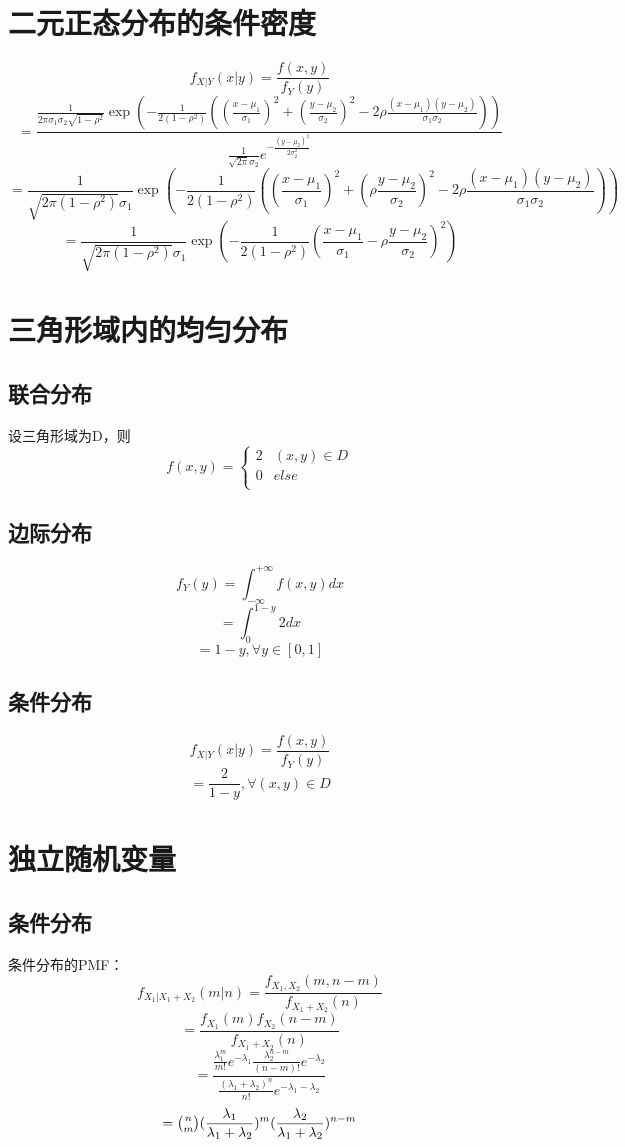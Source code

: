\documentclass{article}
\begin{document}
\begin{CJK}{UTF8}{gbsn}
\section{二元正态分布的条件密度}
$$ f_{X|Y}(x|y)=\frac{f(x,y)}{f_{Y}(y)}$$
$$ =\frac{\frac{1}{2\pi\sigma_{1}\sigma_{2}\sqrt{1-\rho^{2}}}\exp{(-\frac{1}{2(1-\rho^{2})}((\frac{x-\mu_{1}}{\sigma_{1}})^{2}+(\frac{y-\mu_{2}}{\sigma_{2}})^{2}-2\rho\frac{(x-\mu_{1})(y-\mu_{2})}{\sigma_{1}\sigma_{2}}))}}{\frac{1}{\sqrt{2\pi}\sigma_{2}}e^{-\frac{(y-\mu_{2})^{2}}{2\sigma_{2}^{2}}}}$$
$$ =\frac{1}{\sqrt{2\pi(1-\rho^{2})}\sigma_{1}}\exp{(-\frac{1}{2(1-\rho^{2})}((\frac{x-\mu_{1}}{\sigma_{1}})^{2}+(\rho\frac{y-\mu_{2}}{\sigma_{2}})^{2}-2\rho\frac{(x-\mu_{1})(y-\mu_{2})}{\sigma_{1}\sigma_{2}}))}$$
$$ =\frac{1}{\sqrt{2\pi(1-\rho^{2})}\sigma_{1}}\exp{(-\frac{1}{2(1-\rho^{2})}(\frac{x-\mu_{1}}{\sigma_{1}}-\rho\frac{y-\mu_{2}}{\sigma_{2}})^{2})}$$
\section{三角形域内的均匀分布}
\subsection{联合分布}
设三角形域为D，则
\begin{equation}
    f(x,y)=\left\{
    \begin{array}{cl}
    2 & (x,y)\in D\\
    0 & else\\
    \end{array}\right.
\end{equation}
\subsection{边际分布}
$$ f_{Y}(y)=\int_{-\infty}^{+\infty}f(x,y)dx$$
$$ =\int_{0}^{1-y}2dx$$
$$ =1-y,\forall y\in [0,1]$$
\subsection{条件分布}
$$ f_{X|Y}(x|y)=\frac{f(x,y)}{f_{Y}(y)}$$
$$ =\frac{2}{1-y},\forall (x,y)\in D$$
\section{独立随机变量}
\subsection{条件分布}
条件分布的PMF：
$$ f_{X_{1}|X_{1}+X_{2}}(m|n)=\frac{f_{X_{1},X_{2}}(m,n-m)}{f_{X_{1}+X_{2}}(n)}$$
$$ =\frac{f_{X_{1}}(m)f_{X_{2}}(n-m)}{f_{X_{1}+X_{2}}(n)}$$
$$ =\frac{\frac{\lambda_{1}^{m}}{m!}e^{-\lambda_{1}}\frac{\lambda_{2}^{n-m}}{(n-m)!}e^{-\lambda_{2}}}{\frac{(\lambda_{1}+\lambda_{2})^{n}}{n!}e^{-\lambda_{1}-\lambda_{2}}}$$
$$ =\tbinom{n}{m}(\frac{\lambda_{1}}{\lambda_{1}+\lambda_{2}})^{m}(\frac{\lambda_{2}}{\lambda_{1}+\lambda_{2}})^{n-m}$$

\end{CJK}
\end{document}
